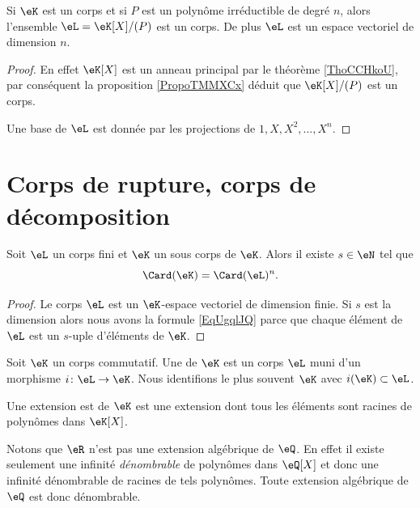 \begin{corollary}       \label{CorsLGiEN}
    Si \( \eK\) est un corps et si \( P\) est un polynôme irréductible de degré \( n\), alors l'ensemble \( \eL=\eK[X]/(P)\) est un corps. De plus \( \eL\) est un espace vectoriel de dimension \( n\).
\end{corollary}

\begin{proof}
    En effet \( \eK[X]\) est un anneau principal par le théorème \ref{ThoCCHkoU}, par conséquent la proposition \ref{PropoTMMXCx} déduit que \( \eK[X]/(P)\) est un corps.

    Une base de \( \eL\) est donnée par les projections de \( 1,X,X^2,\ldots, X^n\).
\end{proof}

\section{Corps de rupture, corps de décomposition}

\begin{lemma}       \label{LemobATFP}
    Soit \( \eL\) un corps fini et \( \eK\) un sous corps de \( \eK\). Alors il existe \( s\in \eN\) tel que
    \begin{equation}        \label{EqUgqlJQ}
        \Card(\eK)=\Card(\eL)^n.
    \end{equation}
\end{lemma}

\begin{proof}
    Le corps \( \eL\) est un \( \eK\)-espace vectoriel de dimension finie. Si \( s\) est la dimension alors nous avons la formule \eqref{EqUgqlJQ} parce que chaque élément de \( \eL\) est un \( s\)-uple d'éléments de \( \eK\).
\end{proof}

\begin{definition}
    Soit \( \eK\) un corps commutatif. Une  de \( \eK\) est un corps \( \eL\) muni d'un morphisme \( i\colon \eL\to \eK\). Nous identifions le plus souvent \( \eK\) avec \( i(\eK)\subset \eL\).

    Une extension est  de \( \eK\) est une extension dont tous les éléments sont racines de polynômes dans \( \eK[X]\).
\end{definition}
Notons que \( \eR\) n'est pas une extension algébrique de \( \eQ\). En effet il existe seulement une infinité \emph{dénombrable} de polynômes dans \( \eQ[X]\) et donc une infinité dénombrable de racines de tels polynômes. Toute extension algébrique de \( \eQ\) est donc dénombrable.

